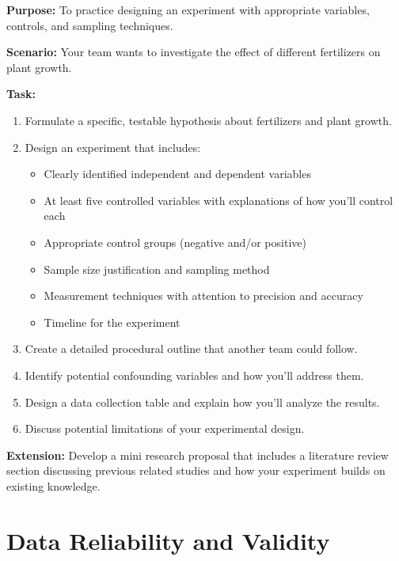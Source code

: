 \documentclass[justified,notoc]{tufte-book}
\newenvironment{investigation}[1]{%
    \begin{tcolorbox}[colback=info!10,colframe=info,title=\textbf{Investigation: #1}]
}{%
    \end{tcolorbox}
}
\begin{document}
\begin{investigation}{Designing a Rigorous Experiment}
\textbf{Purpose:} To practice designing an experiment with appropriate variables, controls, and sampling techniques.

\textbf{Scenario:} Your team wants to investigate the effect of different fertilizers on plant growth.

\textbf{Task:}
\begin{enumerate}
    \item Formulate a specific, testable hypothesis about fertilizers and plant growth.
    
    \item Design an experiment that includes:
    \begin{itemize}
        \item Clearly identified independent and dependent variables
        \item At least five controlled variables with explanations of how you'll control each
        \item Appropriate control groups (negative and/or positive)
        \item Sample size justification and sampling method
        \item Measurement techniques with attention to precision and accuracy
        \item Timeline for the experiment
    \end{itemize}
    
    \item Create a detailed procedural outline that another team could follow.
    
    \item Identify potential confounding variables and how you'll address them.
    
    \item Design a data collection table and explain how you'll analyze the results.
    
    \item Discuss potential limitations of your experimental design.
\end{enumerate}

\textbf{Extension:} Develop a mini research proposal that includes a literature review section discussing previous related studies and how your experiment builds on existing knowledge.
\end{investigation}

\section{Data Reliability and Validity}
\end{document}
